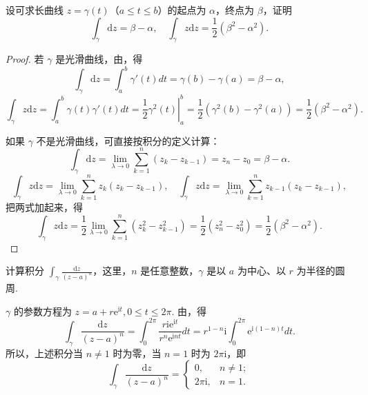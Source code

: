 \documentclass[../../main.tex]{subfiles}
\begin{document}
\begin{example}\label{example:例3.1.3}
设可求长曲线 \( z = \gamma(t) \)（\( a \leqslant t \leqslant b \)）的起点为 \( \alpha \)，终点为 \( \beta \)，证明
\[
\int_\gamma \mathrm{d}z = \beta - \alpha,
\quad
\int_\gamma z \mathrm{d}z = \frac{1}{2}(\beta^2 - \alpha^2).
\]
\end{example}
\begin{proof}
若 \( \gamma \) 是光滑曲线，由，得
\[
\int_\gamma \mathrm{d}z = \int_a^b \gamma'(t)dt
= \gamma(b) - \gamma(a)
= \beta - \alpha,
\]
\[
\int_\gamma z \mathrm{d}z = \int_a^b \gamma(t)\gamma'(t)dt
= \left. \frac{1}{2}\gamma^2(t) \right|_a^b
= \frac{1}{2}(\gamma^2(b) - \gamma^2(a))
= \frac{1}{2}(\beta^2 - \alpha^2).
\]

如果 \( \gamma \) 不是光滑曲线，可直接按积分的定义计算：
\[
\int_\gamma \mathrm{d}z = \lim_{\lambda \to 0} \sum_{k = 1}^n (z_k - z_{k - 1})
= z_n - z_0
= \beta - \alpha.
\]
\[
\int_\gamma z \mathrm{d}z = \lim_{\lambda \to 0} \sum_{k = 1}^n z_k(z_k - z_{k - 1}),
\quad
\int_\gamma z \mathrm{d}z = \lim_{\lambda \to 0} \sum_{k = 1}^n z_{k - 1}(z_k - z_{k - 1}),
\]
把两式加起来，得
\[
\int_\gamma z \mathrm{d}z = \frac{1}{2} \lim_{\lambda \to 0} \sum_{k = 1}^n (z_k^2 - z_{k - 1}^2)
= \frac{1}{2}(z_n^2 - z_0^2)
= \frac{1}{2}(\beta^2 - \alpha^2).
\]
\end{proof}

\begin{example}\label{example:例3.1.4}
计算积分 \( \int_\gamma \frac{\mathrm{d}z}{(z - a)^n} \)，这里，\( n \) 是任意整数，\( \gamma \) 是以 \( a \) 为中心、以 \( r \) 为半径的圆周.
\end{example}
\begin{solution}
\( \gamma \) 的参数方程为 \( z = a + r\mathrm{e}^{\mathrm{i}t}, 0 \leqslant t \leqslant 2\pi \). 由，得
\[
\int_\gamma \frac{\mathrm{d}z}{(z - a)^n} = \int_0^{2\pi} \frac{r\mathrm{i}\mathrm{e}^{\mathrm{i}t}}{r^n\mathrm{e}^{\mathrm{i}nt}}dt
= r^{1 - n}\mathrm{i} \int_0^{2\pi} \mathrm{e}^{\mathrm{i}(1 - n)t}dt.
\]
所以，上述积分当 \( n \neq 1 \) 时为零，当 \( n = 1 \) 时为 \( 2\pi\mathrm{i} \)，即
\[
\int_\gamma \frac{\mathrm{d}z}{(z - a)^n} = 
\begin{cases} 
0, & n \neq 1; \\
2\pi\mathrm{i}, & n = 1.
\end{cases}
\]
\end{solution}
\end{document}
